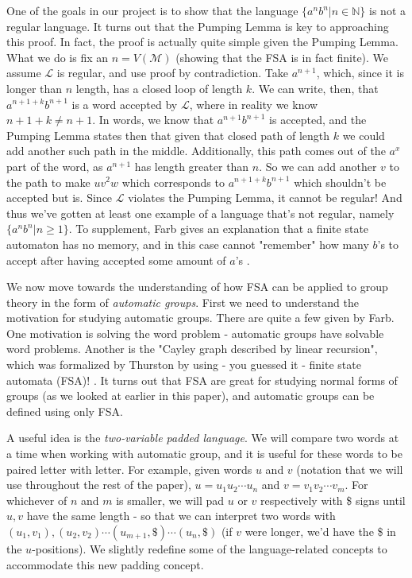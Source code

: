 \documentclass[12pt]{amsart}
\newcommand\N{\mathbb N}
\begin{document}
One of the goals in our project is to show that the language $\{a^nb^n|n\in \N\}$ is not a regular language. It turns out that the Pumping Lemma is key to approaching this proof. In fact, the proof is actually quite simple given the Pumping Lemma. What we do is fix an $n=V(\mathcal{M})$ (showing that the FSA is in fact finite). We assume $\mathcal{L}$ is regular, and use proof by contradiction. Take $a^{n+1}$, which, since it is longer than $n$ length, has a closed loop of length $k$. We can write, then, that $a^{n+1+k}b^{n+1}$ is a word accepted by $\mathcal{L}$, where in reality we know $n+1+k\neq n+1$. In words, we know that $a^{n+1}b^{n+1}$ is accepted, and the Pumping Lemma states then that given that closed path of length $k$ we could add another such path in the middle. Additionally, this path comes out of the $a^x$ part of the word, as $a^{n+1}$ has length greater than $n$. So we can add another $v$ to the path to make $uv^2w$ which corresponds to $a^{n+1+k}b^{n+1}$ which shouldn't be accepted but is. Since $\mathcal{L}$ violates the Pumping Lemma, it cannot be regular! And thus we've gotten at least one example of a language that's not regular, namely $\{a^nb^n|n\geq 1\}$. To supplement, Farb gives an explanation that a finite state automaton has no memory, and in this case cannot "remember" how many $b$'s to accept after having accepted some amount of $a$'s \cite{farb}.

We now move towards the understanding of how FSA can be applied to group theory in the form of \emph{automatic groups}. First we need to understand the motivation for studying automatic groups. There are quite a few given by Farb. One motivation is solving the word problem - automatic groups have solvable word problems. Another is the "Cayley graph described by linear recursion", which was formalized by Thurston by using - you guessed it - finite state automata (FSA)! \cite{farb}. It turns out that FSA are great for studying normal forms of groups (as we looked at earlier in this paper), and automatic groups can be defined using only FSA.

A useful idea is the \emph{two-variable padded language}. We will compare two words at a time when working with automatic group, and it is useful for these words to be paired letter with letter. For example, given words $u$ and $v$ (notation that we will use throughout the rest of the paper), $u=u_1u_2\cdots u_n$ and $v=v_1v_2\cdots v_m$. For whichever of $n$ and $m$ is smaller, we will pad $u$ or $v$ respectively with \$ signs until $u,v$ have the same length - so that we can interpret two words with $(u_1,v_1),(u_2,v_2)\cdots(u_{m+1},\$)\cdots(u_n,\$)$ (if $v$ were longer, we'd have the \$ in the $u$-positions). We slightly redefine some of the language-related concepts to accommodate this new padding concept. 
\end{document}
